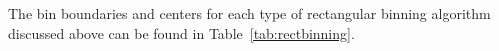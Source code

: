 The bin boundaries and centers for each type of rectangular binning algorithm discussed above can be found in Table~\ref{tab:rectbinning}.
 
